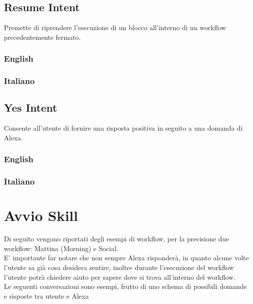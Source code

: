 \subsection{Resume Intent}
Premette di riprendere l'esecuzione di un blocco all'interno di un workflow precedentemente fermato.
\subsubsection{English}
\begin{itemize}
	
	
\end{itemize}

\subsubsection{Italiano}
\begin{itemize}
	
\end{itemize}



\subsection{Yes Intent}
Consente all'utente di fornire una risposta positiva in seguito a una domanda di Alexa.
\subsubsection{English}
\begin{itemize}
	
	
\end{itemize}

\subsubsection{Italiano}
\begin{itemize}
\end{itemize}

\section{Avvio Skill}
Di seguito vengono riportati degli esempi di workflow, per la precisione due workflow: Mattina (Morning) e Social. \\
E' importante far notare che non sempre Alexa risponderà, in quanto alcune volte l'utente sa già cosa desidera sentire, inoltre durante l'esecuzione del workflow l'utente potrà chiedere aiuto per sapere dove si trova all'interno del workflow. \\
Le seguenti conversazioni sono esempi, frutto di uno schema di possibili domande e risposte tra utente e Alexa

